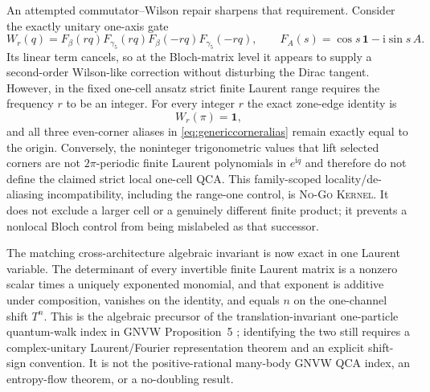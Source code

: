 \documentclass[11pt]{article}
\newcommand{\Kernel}{\textcolor{kernelcolor}{\textsc{Kernel}}}
\newcommand{\NoGo}{\textsc{No-Go}}
\newcommand{\ii}{\mathrm{i}}
\newcommand{\id}{\mathbf{1}}
\begin{document}
An attempted commutator--Wilson repair sharpens that requirement.  Consider
the exactly unitary one-axis gate
\begin{equation}
 W_r(q)=F_{\beta}(rq)F_{\gamma_5}(rq)
        F_{\beta}(-rq)F_{\gamma_5}(-rq),
 \qquad
 F_A(s)=\cos s\,\id-\ii\sin s\,A.
\end{equation}
Its linear term cancels, so at the Bloch-matrix level it appears to supply a
second-order Wilson-like correction without disturbing the Dirac tangent.
However, in the fixed one-cell ansatz strict finite Laurent range requires the
frequency $r$ to be an integer.  For every integer $r$ the exact zone-edge
identity is
\begin{equation}
 W_r(\pi)=\id,
\end{equation}
and all three even-corner aliases in \eqref{eq:genericcorneralias} remain
exactly equal to the origin.  Conversely, the noninteger trigonometric values
that lift selected corners are not $2\pi$-periodic finite Laurent polynomials
in $e^{\ii q}$ and therefore do not define the claimed strict local one-cell
QCA.  This family-scoped locality/de-aliasing incompatibility, including the
range-one control, is \NoGo{} \Kernel{}.  It does not exclude a larger cell or
a genuinely different finite product; it prevents a nonlocal Bloch control
from being mislabeled as that successor.

The matching cross-architecture algebraic invariant is now exact in one
Laurent variable.  The determinant of every invertible finite Laurent matrix
is a nonzero scalar times a uniquely exponented monomial, and that exponent is
additive under composition, vanishes on the identity, and equals $n$ on the
one-channel shift $T^n$.  This is the algebraic precursor of the
translation-invariant one-particle quantum-walk index in GNVW Proposition~5
\cite{GNVW}; identifying the two still requires a complex-unitary
Laurent/Fourier representation theorem and an explicit shift-sign convention.
It is not the positive-rational many-body GNVW QCA index, an entropy-flow
theorem, or a no-doubling result.
\end{document}
